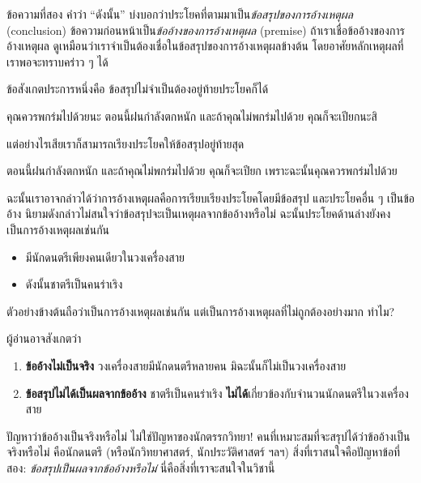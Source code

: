 \documentclass[a4paper,12pt]{extbook}
\theoremstyle{definition}
\theoremstyle{remark}
\newcommand{\q}[1]{``#1''}
\begin{document}
		ข้อความที่สอง คำว่า \q{ดังนั้น} บ่งบอกว่าประโยคที่ตามมาเป็น\textit{ข้อสรุปของการอ้างเหตุผล} (conclusion) ข้อความก่อนหน้าเป็น\textit{ข้ออ้างของการอ้างเหตุผล} (premise) ถ้าเราเชื่อข้ออ้างของการอ้างเหตุผล ดูเหมือนว่าเราจำเป็นต้องเชื่อในข้อสรุปของการอ้างเหตุผลข้างต้น โดยอาศัยหลักเหตุผลที่เราพอจะทราบคร่าว ๆ ได้
		
		ข้อสังเกตประการหนึ่งคือ ข้อสรุปไม่จำเป็นต้องอยู่ท้ายประโยคก็ได้
		\begin{center}
			คุณควรพกร่มไปด้วยนะ ตอนนี้ฝนกำลังตกหนัก และถ้าคุณไม่พกร่มไปด้วย คุณก็จะเปียกนะสิ
		\end{center}
		แต่อย่างไรเสียเราก็สามารถเรียงประโยคให้ข้อสรุปอยู่ท้ายสุด
		\begin{center}
			 ตอนนี้ฝนกำลังตกหนัก และถ้าคุณไม่พกร่มไปด้วย คุณก็จะเปียก เพราะฉะนั้นคุณควรพกร่มไปด้วย
		\end{center}
		ฉะนั้นเราอาจกล่าวได้ว่าการอ้างเหตุผลคือการเรียบเรียงประโยคโดยมีข้อสรุป และประโยคอื่น ๆ เป็นข้ออ้าง นิยามดังกล่าวไม่สนใจว่าข้อสรุปจะเป็นเหตุผลจากข้ออ้างหรือไม่ ฉะนั้นประโยคด้านล่างยังคงเป็นการอ้างเหตุผลเช่นกัน
		\begin{itemize}
			\item [] มีนักดนตรีเพียงคนเดียวในวงเครื่องสาย
			\item [] ดังนั้นชาตรีเป็นคนร่าเริง
		\end{itemize}
		ตัวอย่างข้างต้นถือว่าเป็นการอ้างเหตุผลเช่นกัน แต่เป็นการอ้างเหตุผลที่ไม่ถูกต้องอย่างมาก ทำไม?
		
		ผู้อ่านอาจสังเกตว่า
		\begin{enumerate}
			\item \textbf{ข้ออ้างไม่เป็นจริง} วงเครื่องสายมีนักดนตรีหลายคน มิฉะนั้นก็ไม่เป็นวงเครื่องสาย
			\item \textbf{ข้อสรุปไม่ได้เป็นผลจากข้ออ้าง} ชาตรีเป็นคนร่าเริง \textbf{ไม่ได้}เกี่ยวข้องกับจำนวนนักดนตรีในวงเครื่องสาย
		\end{enumerate}
		ปัญหาว่าข้ออ้างเป็นจริงหรือไม่ ไม่ใช่ปัญหาของนักตรรกวิทยา! คนที่เหมาะสมที่จะสรุปได้ว่าข้ออ้างเป็นจริงหรือไม่ คือนักดนตรี (หรือนักวิทยาศาสตร์, นักประวัติศาสตร์ ฯลฯ) สิ่งที่เราสนใจคือปัญหาข้อที่สอง: \textit{ข้อสรุปเป็นผลจากข้ออ้างหรือไม่} นี่คือสิ่งที่เราจะสนใจในวิชานี้
		
\end{document}
